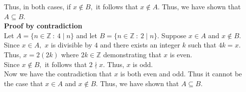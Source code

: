 \documentclass[11pt]{report}
\theoremstyle{plain}
\begin{document}
\begin{enumerate}
Thus, in both cases, if $x \not \in B,$ it follows that $x \not \in A.$ Thus, we have shown that $A \subseteq B$.\\

\textbf{Proof by contradiction}\\
Let $A=\{n \in \mathbb{Z} \: : \: 4\mid n \}$ and let $B= \{n \in \mathbb{Z} \: : \: 2\mid n\}.$ Suppose $x \in A$ and $x \not \in B.$ Since $x \in A,$ $x$ is divisible by $4$ and there exists an integer $k$ such that $4k=x.$ Thus, $x=2(2k)$ where $2k \in \mathbb{Z}$ demonstrating that $x$ is even. \\

Since $x \not \in B,$ it follows that $2 \nmid x.$ Thus, $x$ is odd.\\

Now we have the contradiction that $x$ is both even and odd. Thus it cannot be the case that $x \in A$ and $x \not \in B.$ Thus, we have shown that $A \subseteq B$.

\end{enumerate}
\end{document}
